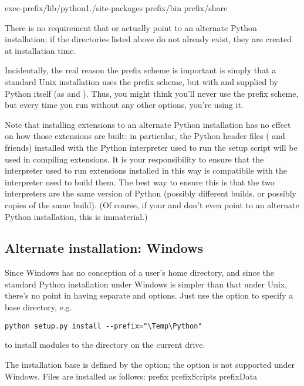 \documentclass{howto}
\begin{document}
              {exec-prefix}{/lib/python1./site-packages}
              {prefix}{/bin}
              {prefix}{/share}

There is no requirement that  or 
actually point to an alternate Python installation; if the directories
listed above do not already exist, they are created at installation
time.

Incidentally, the real reason the prefix scheme is important is simply
that a standard Unix installation uses the prefix scheme, but with
 and  supplied by Python itself (as
 and ).  Thus, you might think
you'll never use the prefix scheme, but every time you run  without any other options, you're using it.

Note that installing extensions to an alternate Python installation has
no effect on how those extensions are built: in particular, the Python
header files ( and friends) installed with the Python
interpreter used to run the setup script will be used in compiling
extensions.  It is your responsibility to ensure that the interpreter
used to run extensions installed in this way is compatibile with the
interpreter used to build them.  The best way to ensure this is that the
two interpreters are the same version of Python (possibly different
builds, or possibly copies of the same build).  (Of course, if your
 and  don't even point to an
alternate Python installation, this is immaterial.)


\subsection{Alternate installation: Windows}
\label{sec:alt-windows}

Since Windows has no conception of a user's home directory, and since
the standard Python installation under Windows is simpler than that
under Unix, there's no point in having separate  and
 options.  Just use the  option to specify
a base directory, e.g.
\begin{verbatim}
python setup.py install --prefix="\Temp\Python"
\end{verbatim}
to install modules to the  directory on the current
drive.

The installation base is defined by the  option; the
 option is not supported under Windows.  Files are
installed as follows:
              {prefix}{}
              {prefix}{\bslash{}Scripts}
              {prefix}{\bslash{}Data}
\end{document}
